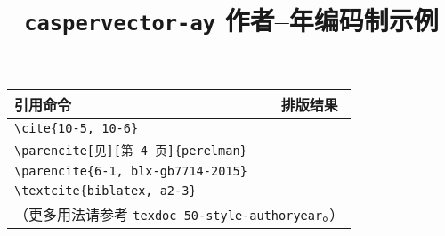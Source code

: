 \documentclass[UTF8]{ctexart}
\begin{document}
\title{\textbf{\texttt{caspervector-ay} 作者--年编码制示例}}
\author{}
\date{}
\maketitle
\vspace*{-1em}

\begin{center}
\begin{tabular}{ll}\hline
引用命令 &	排版结果 \\\hline
\verb|\cite{10-5, 10-6}| &	\cite{10-5, 10-6} \\
\verb|\parencite[见][第 4 页]{perelman}| &	\parencite[见][第 4 页]{perelman} \\
\verb|\parencite{6-1, blx-gb7714-2015}| &	\parencite{6-1, blx-gb7714-2015} \\
\verb|\textcite{biblatex, a2-3}| &	\textcite{biblatex, a2-3} \\\hline
\multicolumn{2}{l}{（更多用法请参考 \texttt{texdoc 50-style-authoryear}。）} \\
\end{tabular}
\end{center}

\printbibliography[category = cited, title = {本文参考文献}]
\printbibliography[notcategory = cited, title = {%
	其它参考文献示例
	（引自\texorpdfstring{文献 \parencite{gbt7714-2005}}{ GB/T 7714-2005}）%
}]
\nocite{*}
\end{document}
